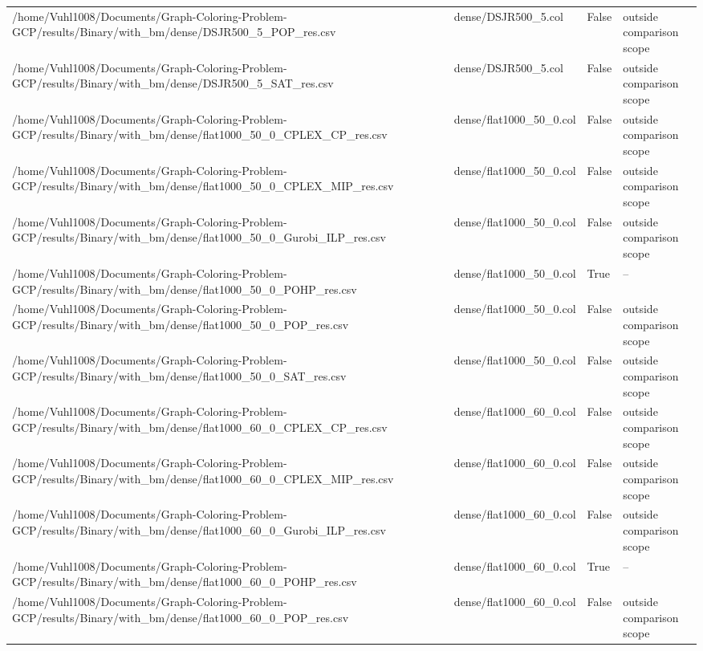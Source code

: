 \begin{table}[htbp]
\begin{tabular}{llll}
/home/Vuhl1008/Documents/Graph-Coloring-Problem-GCP/results/Binary/with\_bm/dense/DSJR500\_5\_POP\_res.csv & dense/DSJR500\_5.col & False & outside comparison scope \\
/home/Vuhl1008/Documents/Graph-Coloring-Problem-GCP/results/Binary/with\_bm/dense/DSJR500\_5\_SAT\_res.csv & dense/DSJR500\_5.col & False & outside comparison scope \\
/home/Vuhl1008/Documents/Graph-Coloring-Problem-GCP/results/Binary/with\_bm/dense/flat1000\_50\_0\_CPLEX\_CP\_res.csv & dense/flat1000\_50\_0.col & False & outside comparison scope \\
/home/Vuhl1008/Documents/Graph-Coloring-Problem-GCP/results/Binary/with\_bm/dense/flat1000\_50\_0\_CPLEX\_MIP\_res.csv & dense/flat1000\_50\_0.col & False & outside comparison scope \\
/home/Vuhl1008/Documents/Graph-Coloring-Problem-GCP/results/Binary/with\_bm/dense/flat1000\_50\_0\_Gurobi\_ILP\_res.csv & dense/flat1000\_50\_0.col & False & outside comparison scope \\
/home/Vuhl1008/Documents/Graph-Coloring-Problem-GCP/results/Binary/with\_bm/dense/flat1000\_50\_0\_POHP\_res.csv & dense/flat1000\_50\_0.col & True & -- \\
/home/Vuhl1008/Documents/Graph-Coloring-Problem-GCP/results/Binary/with\_bm/dense/flat1000\_50\_0\_POP\_res.csv & dense/flat1000\_50\_0.col & False & outside comparison scope \\
/home/Vuhl1008/Documents/Graph-Coloring-Problem-GCP/results/Binary/with\_bm/dense/flat1000\_50\_0\_SAT\_res.csv & dense/flat1000\_50\_0.col & False & outside comparison scope \\
/home/Vuhl1008/Documents/Graph-Coloring-Problem-GCP/results/Binary/with\_bm/dense/flat1000\_60\_0\_CPLEX\_CP\_res.csv & dense/flat1000\_60\_0.col & False & outside comparison scope \\
/home/Vuhl1008/Documents/Graph-Coloring-Problem-GCP/results/Binary/with\_bm/dense/flat1000\_60\_0\_CPLEX\_MIP\_res.csv & dense/flat1000\_60\_0.col & False & outside comparison scope \\
/home/Vuhl1008/Documents/Graph-Coloring-Problem-GCP/results/Binary/with\_bm/dense/flat1000\_60\_0\_Gurobi\_ILP\_res.csv & dense/flat1000\_60\_0.col & False & outside comparison scope \\
/home/Vuhl1008/Documents/Graph-Coloring-Problem-GCP/results/Binary/with\_bm/dense/flat1000\_60\_0\_POHP\_res.csv & dense/flat1000\_60\_0.col & True & -- \\
/home/Vuhl1008/Documents/Graph-Coloring-Problem-GCP/results/Binary/with\_bm/dense/flat1000\_60\_0\_POP\_res.csv & dense/flat1000\_60\_0.col & False & outside comparison scope \\

\end{tabular}
\end{table}
